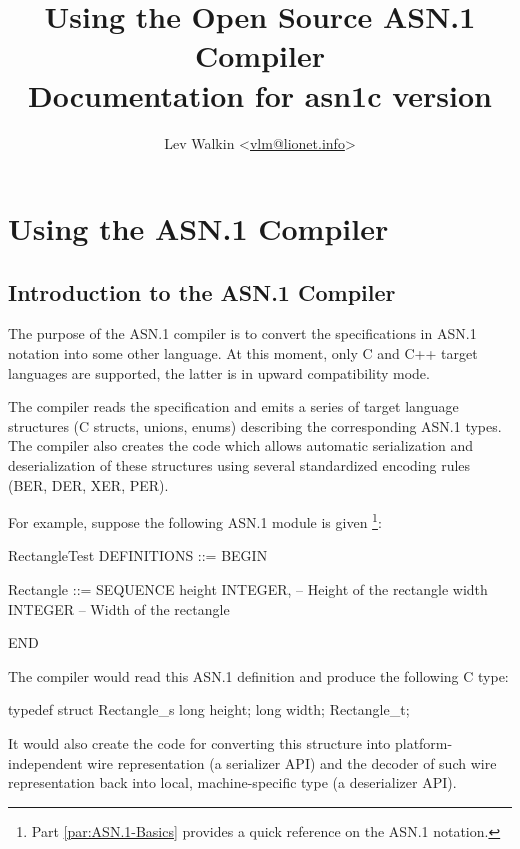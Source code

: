 \documentclass[english,oneside,12pt]{book}
\begin{document}
\title{Using the Open Source ASN.1 Compiler\\
\vspace*{0.4cm}
\Large Documentation for asn1c version \asnver{}}
\author{Lev Walkin <\href{mailto:vlm@lionet.info?Subject=asn1c}{vlm@lionet.info}>}
\date{}

\pagestyle{fancy}
\fancyhead[L]{\leftmark}
\maketitle

\tableofcontents{}

\part{Using the ASN.1 Compiler}


\chapter{Introduction to the ASN.1 Compiler}

The purpose of the ASN.1 compiler is to convert the specifications
in ASN.1 notation into some other language. At this moment, only C
and C++ target languages are supported, the latter is in upward compatibility
mode.

The compiler reads the specification and emits a series of target
language structures (C structs, unions, enums) describing the corresponding
ASN.1 types. The compiler also creates the code which allows automatic
serialization and deserialization of these structures using several
standardized encoding rules (BER, DER, XER, PER).

For example, suppose the following ASN.1 module is given%
\footnote{Part \ref{par:ASN.1-Basics} provides a quick reference
on the ASN.1 notation.}:
\begin{asn}
RectangleTest DEFINITIONS ::= BEGIN

Rectangle ::= SEQUENCE {
    height  INTEGER,        -- Height of the rectangle
    width   INTEGER         -- Width of the rectangle
}

END
\end{asn}
The compiler would read this ASN.1 definition and produce the following
C type:
\begin{codesample}
typedef struct Rectangle_s {
    long height;
    long width;
} Rectangle_t;
\end{codesample}
It would also create the code for converting this structure into platform-independent
wire representation (a serializer API) and the decoder of such wire
representation back into local, machine-specific type (a deserializer
API).
\end{document}
